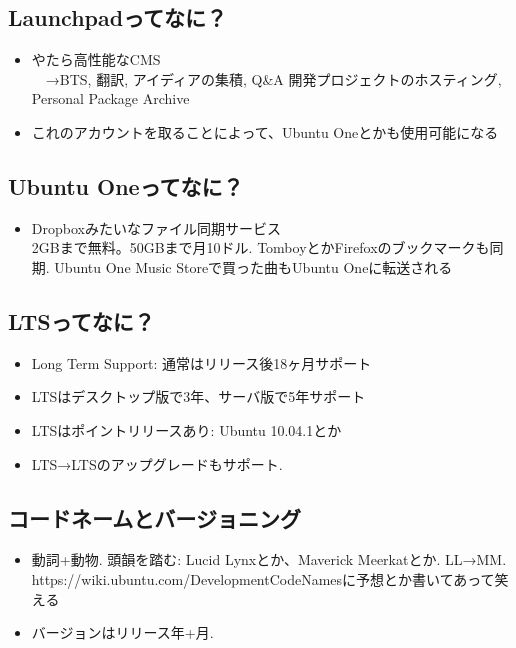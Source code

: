 \documentclass[mingoth,a4paper]{jsarticle}
\begin{document}
\begin{multicols}{2}
\subsection{Launchpadってなに？}
\begin{itemize}
      \item やたら高性能なCMS\\
    　→BTS, 翻訳, アイディアの集積, Q\&A
    開発プロジェクトのホスティング, Personal Package Archive
      \item これのアカウントを取ることによって、Ubuntu Oneとかも使用可能になる
\end{itemize}

\subsection{Ubuntu Oneってなに？}
\begin{itemize}
      \item Dropboxみたいなファイル同期サービス\\
    2GBまで無料。50GBまで月10ドル. TomboyとかFirefoxのブックマークも同期.
    Ubuntu One Music Storeで買った曲もUbuntu Oneに転送される
\end{itemize}

\subsection{LTSってなに？}
\begin{itemize}
      \item Long Term Support: 通常はリリース後18ヶ月サポート
      \item LTSはデスクトップ版で3年、サーバ版で5年サポート
      \item LTSはポイントリリースあり: Ubuntu 10.04.1とか
      \item LTS→LTSのアップグレードもサポート.
\end{itemize}

\subsection{コードネームとバージョニング}
\begin{itemize}
      \item  動詞+動物. 頭韻を踏む: Lucid Lynxとか、Maverick Meerkatとか. LL→MM. \\
    https://wiki.ubuntu.com/DevelopmentCodeNamesに予想とか書いてあって笑える
    \item バージョンはリリース年+月. 
\end{itemize}


\end{multicols}
\end{document}
